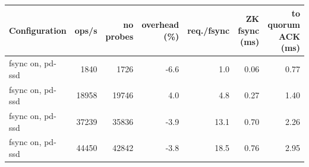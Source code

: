 \begin{tabular}{@{}lrrrrrr@{}}
\toprule
Configuration & ops/s & no probes & overhead (\%) & req./fsync & ZK fsync (ms) & to quorum ACK (ms) \\
\midrule
fsync on, pd-ssd & 1840 & 1726 & -6.6 & 1.0 & 0.06 & 0.77 \\
fsync on, pd-ssd & 18958 & 19746 & 4.0 & 4.8 & 0.27 & 1.40 \\
fsync on, pd-ssd & 37239 & 35836 & -3.9 & 13.1 & 0.70 & 2.26 \\
fsync on, pd-ssd & 44450 & 42842 & -3.8 & 18.5 & 0.76 & 2.95 \\
\bottomrule
\end{tabular}
